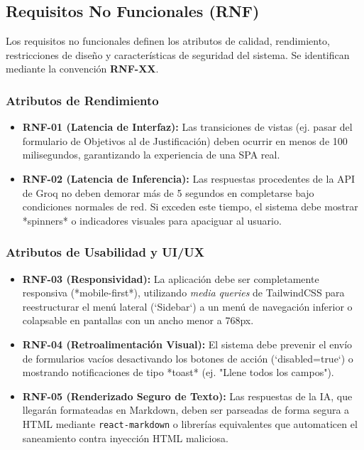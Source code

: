 \subsection{Requisitos No Funcionales (RNF)}
Los requisitos no funcionales definen los atributos de calidad, rendimiento, restricciones de diseño y características de seguridad del sistema. Se identifican mediante la convención \textbf{RNF-XX}.

\subsubsection{Atributos de Rendimiento}
\begin{itemize}
    \item \textbf{RNF-01 (Latencia de Interfaz):} Las transiciones de vistas (ej. pasar del formulario de Objetivos al de Justificación) deben ocurrir en menos de 100 milisegundos, garantizando la experiencia de una SPA real.
    \item \textbf{RNF-02 (Latencia de Inferencia):} Las respuestas procedentes de la API de Groq no deben demorar más de 5 segundos en completarse bajo condiciones normales de red. Si exceden este tiempo, el sistema debe mostrar *spinners* o indicadores visuales para apaciguar al usuario.
\end{itemize}

\subsubsection{Atributos de Usabilidad y UI/UX}
\begin{itemize}
    \item \textbf{RNF-03 (Responsividad):} La aplicación debe ser completamente responsiva (*mobile-first*), utilizando \textit{media queries} de TailwindCSS para reestructurar el menú lateral (`Sidebar`) a un menú de navegación inferior o colapsable en pantallas con un ancho menor a 768px.
    \item \textbf{RNF-04 (Retroalimentación Visual):} El sistema debe prevenir el envío de formularios vacíos desactivando los botones de acción (`disabled=true`) o mostrando notificaciones de tipo *toast* (ej. "Llene todos los campos").
    \item \textbf{RNF-05 (Renderizado Seguro de Texto):} Las respuestas de la IA, que llegarán formateadas en Markdown, deben ser parseadas de forma segura a HTML mediante \texttt{react-markdown} o librerías equivalentes que automaticen el saneamiento contra inyección HTML maliciosa.
\end{itemize}

